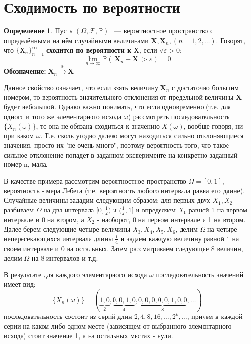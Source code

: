 \documentclass[12pt, twoside]{article}
\newcommand{\X}{\mathbf{X}}
\theoremstyle{definition}
\newtheorem*{definition*}{Определение}
\begin{document}


\section{Сходимость по вероятности}
\begin{definition*}
Пусть $(\Omega,\mathcal{F},\mathbb{P})$ ~--- вероятностное пространство с определёнными на нём случайными величинами $\X,\X_n,(n=1,2,\dots)$. Говорят, что $\{\X_n\}_{n=1}^\infty$ \textbf{сходится по вероятности к} $\X$, если $\forall\varepsilon>0$:
\begin{equation}\label{eq1}
\lim_{n \to \infty}\mathbb{P}(|\X_n-\X|>\varepsilon)=0
\end{equation}
\textbf{Обозначение:} $\X_n\xrightarrow{\mathbb{P}}\X$ 
\end{definition*}

Данное свойство означает, что если взять величину $\X_n$ с достаточно большим номером, то вероятность значительного отклонения от предельной величины $\X$ будет небольшой. Однако важно понимать, что если одновременно (т.е. для одного и того же элементарного исхода $\omega$) рассмотреть последовательность $\{X_n(\omega)\}$, то она не обязана сходиться к значению $X(\omega)$, вообще говоря, ни при каком $\omega$. Т.е. сколь угодно далеко могут находиться сильно отклоняющиеся значения, просто их "не очень много", поэтому вероятность того, что такое сильное отклонение попадет в заданном эксперименте на конкретно заданный номер n, мала.

В качестве примера рассмотрим вероятностное пространство $\Omega = [0,1]$, вероятность - мера Лебега (т.е. вероятность любого интервала равна его длине). Случайные величины зададим следующим образом: для первых двух $X_1, X_2$ разбиваем $\Omega$ на два интервала $[0,\frac{1}{2})$ и $(\frac{1}{2},1]$ и определяем $X_1$ равной 1 на первом интервале и 0 на втором, а $X_2$ - наоборот, 0 на первом интервале и 1 на втором. Далее берем следующие четыре величины $X_3,X_4,X_5,X_6$, делим $\Omega$ на четыре непересекающихся интервала длины $\frac14$ и задаем каждую величину равной 1 на своем интервале и 0 на остальных. Затем рассматриваем следующие 8 величин, делим $\Omega$ на 8 интервалов и т.д.

В результате для каждого элементарного исхода $\omega$ последовательность значений имеет вид:
\begin{equation}\label{eq2}
\{X_n(\omega)\}=(\underbrace{1,0}_2,\underbrace{0,0,1,0}_4,\underbrace{0,0,0,0,0,1,0,0}_8,\ldots)
\end{equation}
последовательность состоит из серий длин $2,4,8,16,\dots,2^k,\dots$, причем в каждой серии на каком-либо одном месте (зависящем от выбранного элементарного исхода) стоит значение 1, а на остальных местах - нули. 
\end{document}
